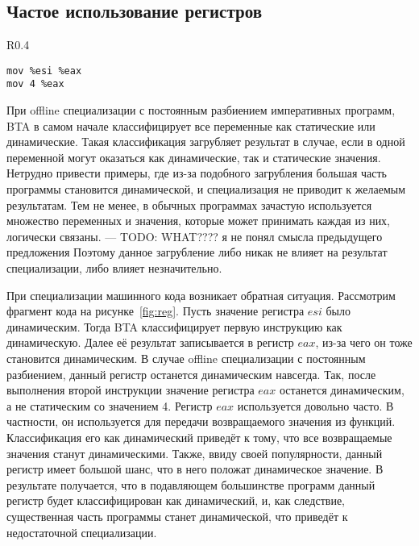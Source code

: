\subsection{Частое использование регистров}
\label{part:4.1}

\begin{wrapfigure}{R}{0.4\textwidth}
\begin{lstlisting}[xleftmargin = 20pt]
mov %esi %eax
mov 4 %eax
\end{lstlisting}
\caption{Фрагмент кода: частое использование регистров}
\label{fig:reg}
\end{wrapfigure}

При offline специализации с постоянным разбиением императивных программ, BTA в самом начале классифицирует все переменные
как статические или динамические.
Такая классификация загрубляет результат в случае, если в одной переменной могут оказаться как динамические, так и статические значения.
Нетрудно привести примеры, где из-за подобного загрубления большая часть программы становится динамической,
и специализация не приводит к желаемым результатам.
Тем не менее, в обычных программах зачастую используется множество переменных и значения, которые может принимать каждая из них,
логически связаны. {\color{red}--- TODO: WHAT????  я не понял смысла предыдущего предложения}
Поэтому данное загрубление либо никак не влияет на результат специализации, либо влияет незначительно.

При специализации машинного кода возникает обратная ситуация. Рассмотрим фрагмент кода на рисунке~\ref{fig:reg}. Пусть значение регистра $esi$ было динамическим. Тогда BTA классифицирует первую инструкцию как динамическую. Далее её результат записывается в регистр $eax$, из-за чего он тоже становится динамическим. В случае offline специализации с постоянным разбиением, данный регистр останется динамическим навсегда. Так, после выполнения второй инструкции значение регистра $eax$ останется динамическим, а не статическим со значением 4. Регистр $eax$ используется довольно часто. В частности, он используется для передачи возвращаемого значения из функций. Классификация его как динамический приведёт к тому, что все возвращаемые значения станут динамическими. Также, ввиду своей популярности, данный регистр имеет большой шанс, что в него положат динамическое значение. В результате получается, что в подавляющем большинстве программ данный регистр будет классифицирован как динамический,
и, как следствие, существенная часть программы станет динамической, что приведёт к недостаточной специализации.

